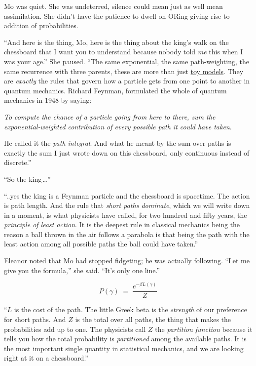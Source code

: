 Mo was quiet. She was undeterred, silence could mean just as well mean assimilation. She didn't have the patience to dwell on ORing giving rise to addition of probabilities.
 
``And here is the thing, Mo, here is the thing about the king's walk on the chessboard that I want you to understand because nobody told \emph{me} this when I was your age.'' She paused. ``The same exponential, the same
path-weighting, the same recurrence with three parents, these are more than just \href{https://leelemacjames.github.io/fowardsBackwards.pdf}{toy models}. They are \emph{exactly} the rules that govern how a particle gets from one point to another in quantum mechanics.
Richard Feynman,  formulated the whole of quantum mechanics in 1948 by saying:

\emph{To compute the chance of a particle going from here to there,
sum the exponential-weighted contribution of every possible path it
could have taken}. 

He called it the \emph{path integral}. And what he meant by the sum over paths is exactly the sum I just wrote down
on this chessboard, only continuous instead of discrete.''
 
``So the king\,\ldots''
 
``..yes the king is a Feynman particle and the chessboard is spacetime. The action is path length. And the rule that \emph{short paths dominate}, which we will write down in a moment, is what physicists
have called, for two hundred and fifty years, the \emph{principle of
least action}. It is the deepest rule in classical mechanics being the
reason a ball thrown in the air follows a parabola is that being the path with the least action among all possible paths
the ball could have taken.''
 
Eleanor noted that Mo had stopped fidgeting; he was actually following. ``Let me give you the formula,'' she said. ``It's only one line.''
 
\[
  P(\gamma) \;=\; \frac{e^{-\beta L(\gamma)}}{Z}
\]
 
``$L$ is the cost of the path. The little Greek beta is the
\emph{strength} of our preference for short paths. And $Z$ is the
total over all paths, the thing that makes the probabilities add up
to one. The physicists call $Z$ the \emph{partition function}
because it tells you how the total probability is
\emph{partitioned} among the available paths. It is the most
important single quantity in statistical mechanics, and we are
looking right at it on a chessboard.''
 

